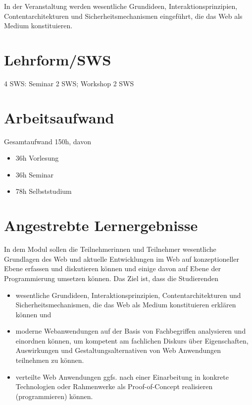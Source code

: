 In der Veranstaltung werden wesentliche Grundideen,
Interaktionsprinzipien, Contentarchitekturen und Sicherheitsmechanismen
eingeführt, die das Web als Medium konstituieren.

\hypertarget{lehrformswspathlabelmi-2017modulbeschreibungen-bachelorba_grundlagen-des-web}{%
\section*{Lehrform/SWS\label{/mi-2017/modulbeschreibungen-bachelor/BA_Grundlagen-des-web}}\label{lehrformswspathlabelmi-2017modulbeschreibungen-bachelorba_grundlagen-des-web}}

4 SWS: Seminar 2 SWS; Workshop 2 SWS

\hypertarget{arbeitsaufwandpathlabelmi-2017modulbeschreibungen-bachelorba_grundlagen-des-web}{%
\section*{Arbeitsaufwand\label{/mi-2017/modulbeschreibungen-bachelor/BA_Grundlagen-des-web}}\label{arbeitsaufwandpathlabelmi-2017modulbeschreibungen-bachelorba_grundlagen-des-web}}

Gesamtaufwand 150h, davon

\begin{itemize}
\tightlist
\item
  36h Vorlesung
\item
  36h Seminar
\item
  78h Selbststudium
\end{itemize}

\hypertarget{angestrebte-lernergebnissepathlabelmi-2017modulbeschreibungen-bachelorba_grundlagen-des-web}{%
\section*{Angestrebte
Lernergebnisse\label{/mi-2017/modulbeschreibungen-bachelor/BA_Grundlagen-des-web}}\label{angestrebte-lernergebnissepathlabelmi-2017modulbeschreibungen-bachelorba_grundlagen-des-web}}

In dem Modul sollen die Teilnehmerinnen und Teilnehmer wesentliche
Grundlagen des Web und aktuelle Entwicklungen im Web auf konzeptioneller
Ebene erfassen und diskutieren können und einige davon auf Ebene der
Programmierung umsetzen können. Das Ziel ist, dass die Studierenden

\begin{itemize}
\tightlist
\item
  wesentliche Grundideen, Interaktionsprinzipien, Contentarchitekturen
  und Sicherheitsmechanismen, die das Web als Medium konstituieren
  erklären können und
\item
  moderne Webanwendungen auf der Basis von Fachbegriffen analysieren und
  einordnen können, um kompetent am fachlichen Diskurs über
  Eigenschaften, Auswirkungen und Gestaltungsalternativen von Web
  Anwendungen teilnehmen zu können.
\item
  verteilte Web Anwendungen ggfs. nach einer Einarbeitung in konkrete
  Technologien oder Rahmenwerke als Proof-of-Concept realisieren
  (programmieren) können.
\end{itemize}

